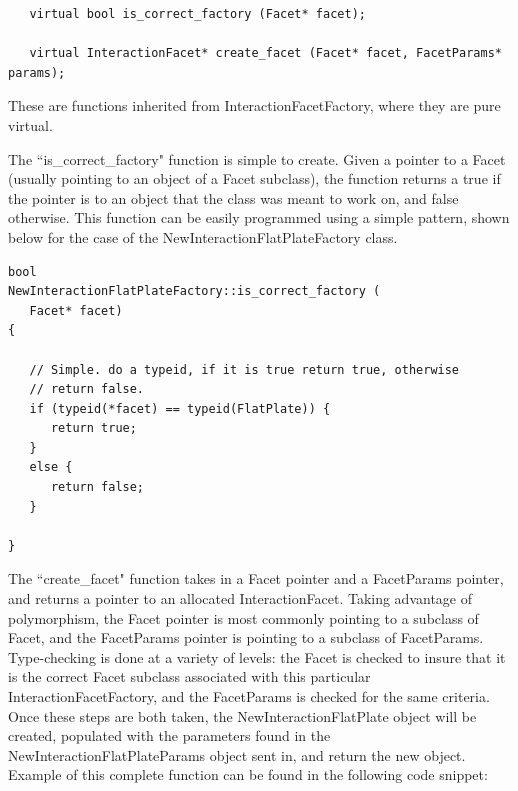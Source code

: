 \begin{verbatim}
   virtual bool is_correct_factory (Facet* facet);

   virtual InteractionFacet* create_facet (Facet* facet, FacetParams* params);

\end{verbatim}

These are functions inherited from InteractionFacetFactory, where they are
pure virtual.

The ``is\_correct\_factory" function is simple to create. Given a pointer to a Facet
(usually pointing to an object of a Facet subclass), the
function returns a true if the pointer is to an object that the
class was meant to work on, and false otherwise. This function can be
easily programmed using a simple pattern, shown below for the case of
the NewInteractionFlatPlateFactory class.

\begin{verbatim}
bool
NewInteractionFlatPlateFactory::is_correct_factory (
   Facet* facet)
{

   // Simple. do a typeid, if it is true return true, otherwise
   // return false.
   if (typeid(*facet) == typeid(FlatPlate)) {
      return true;
   }
   else {
      return false;
   }

}
\end{verbatim}

The ``create\_facet" function takes in a Facet pointer and a FacetParams
pointer, and returns a pointer to an allocated InteractionFacet.
Taking advantage of polymorphism, the Facet pointer is most commonly
pointing to a subclass of Facet, and the FacetParams pointer is
pointing to a subclass of FacetParams. Type-checking is done at
a variety of levels: the Facet is checked to insure that it is
the correct Facet subclass associated with this particular
InteractionFacetFactory, and the FacetParams is checked for the
same criteria. Once these steps are both taken, the NewInteractionFlatPlate
object will be created, populated with the parameters found in
the NewInteractionFlatPlateParams object sent in, and return the
new object. Example of this complete function can be found
in the following code snippet:

